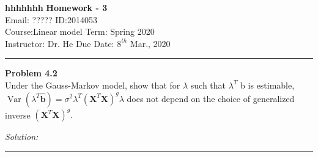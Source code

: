 \documentclass[a4paper, 11pt]{article}
\newenvironment{problem}[2][Problem]
    { \begin{mdframed}[backgroundcolor=gray!20] \textbf{#1 #2} \\}
    {  \end{mdframed}}
\newenvironment{solution}
    {\textit{Solution:}}
    {}
\begin{document}
\noindent
\large\textbf{hhhhhhh} \hfill \textbf{Homework - 3}   \\
Email: ????? \hfill ID:2014053 \\
\normalsize Course:Linear model \hfill Term: Spring 2020\\
Instructor: Dr. He \hfill Due Date: $8^{th}$ Mar., 2020 \\
\noindent\rule{7in}{2.8pt}
\begin{problem}{4.2}
 Under the Gauss-Markov model, show that for \(\lambda\) such that \(\lambda^{T}\) b is estimable,
\(\operatorname{Var}\left(\lambda^{T} \hat{\mathbf{b}}\right)=\sigma^{2} \lambda^{T}\left(\mathbf{X}^{T} \mathbf{X}\right)^{g} \lambda\) does not depend on the choice of generalized
inverse \(\left(\mathbf{X}^{T} \mathbf{X}\right)^{g} .\)

\end{problem}
\begin{solution}

\end{solution} 
\noindent\rule{7in}{2.8pt}

\end{document}
